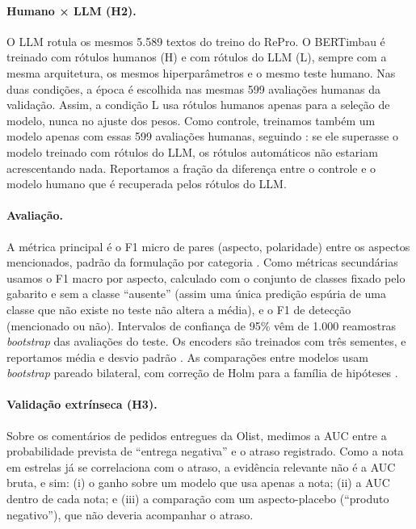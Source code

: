 \documentclass[a4paper, twocolumn, 11pt, twoside]{article}
\begin{document}
\paragraph{Humano × LLM (H2).} O LLM rotula os mesmos 5.589 textos do treino do RePro. O BERTimbau é treinado com rótulos humanos (H) e com rótulos do LLM (L), sempre com a mesma arquitetura, os mesmos hiperparâmetros e o mesmo teste humano. Nas duas condições, a época é escolhida nas mesmas 599 avaliações humanas da validação. Assim, a condição L usa rótulos humanos apenas para a seleção de modelo, nunca no ajuste dos pesos. Como controle, treinamos também um modelo apenas com essas 599 avaliações humanas, seguindo \citet{zhu2023weaker}: se ele superasse o modelo treinado com rótulos do LLM, os rótulos automáticos não estariam acrescentando nada. Reportamos a fração da diferença entre o controle e o modelo humano que é recuperada pelos rótulos do LLM.

\paragraph{Avaliação.} A métrica principal é o F1 micro de pares (aspecto, polaridade) entre os aspectos mencionados, padrão da formulação por categoria \citep{pontiki2016semeval}. Como métricas secundárias usamos o F1 macro por aspecto, calculado com o conjunto de classes fixado pelo gabarito e sem a classe ``ausente'' (assim uma única predição espúria de uma classe que não existe no teste não altera a média), e o F1 de detecção (mencionado ou não). Intervalos de confiança de 95\% vêm de 1.000 reamostras \emph{bootstrap} das avaliações do teste. Os encoders são treinados com três sementes, e reportamos média e desvio padrão \citep{reimers2017reporting}. As comparações entre modelos usam \emph{bootstrap} pareado bilateral, com correção de Holm para a família de hipóteses \citep{dror2018hitchhiker,holm1979}.

\paragraph{Validação extrínseca (H3).} Sobre os comentários de pedidos entregues da Olist, medimos a AUC entre a probabilidade prevista de ``entrega negativa'' e o atraso registrado. Como a nota em estrelas já se correlaciona com o atraso, a evidência relevante não é a AUC bruta, e sim: (i) o ganho sobre um modelo que usa apenas a nota; (ii) a AUC dentro de cada nota; e (iii) a comparação com um aspecto-placebo (``produto negativo''), que não deveria acompanhar o atraso.
\end{document}
